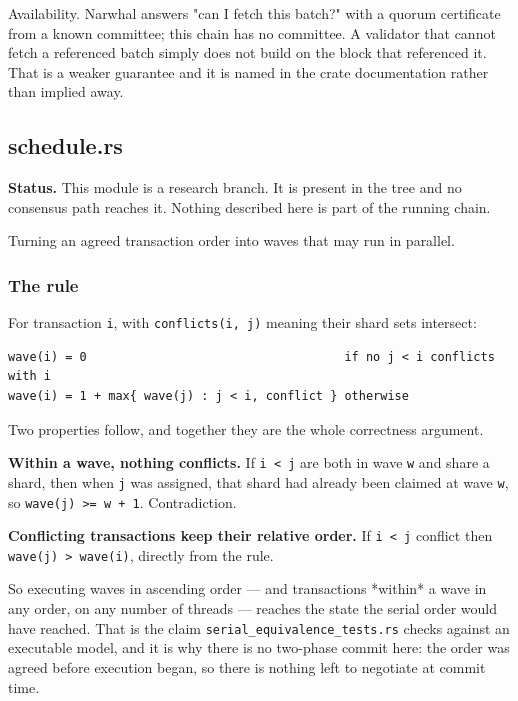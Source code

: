 \documentclass[11pt,a4paper]{article}
\begin{document}
Availability. Narwhal answers "can I fetch this batch?" with a quorum
certificate from a known committee; this chain has no committee. A validator
that cannot fetch a referenced batch simply does not build on the block that
referenced it. That is a weaker guarantee and it is named in the crate
documentation rather than implied away.

\subsection{schedule.rs}
\begin{framed}\noindent\textbf{Status.} This module is a research branch. It is present in the tree and no consensus path reaches it. Nothing described here is part of the running chain.\end{framed}

Turning an agreed transaction order into waves that may run in parallel.

\subsubsection{The rule}

For transaction \texttt{i}, with \texttt{conflicts(i, j)} meaning their shard sets
intersect:

\begin{verbatim}
wave(i) = 0                                    if no j < i conflicts with i
wave(i) = 1 + max{ wave(j) : j < i, conflict } otherwise
\end{verbatim}

Two properties follow, and together they are the whole correctness argument.

\textbf{Within a wave, nothing conflicts.} If \texttt{i < j} are both in wave \texttt{w} and
share a shard, then when \texttt{j} was assigned, that shard had already been
claimed at wave \texttt{w}, so \texttt{wave(j) >= w + 1}. Contradiction.

\textbf{Conflicting transactions keep their relative order.} If \texttt{i < j} conflict
then \texttt{wave(j) > wave(i)}, directly from the rule.

So executing waves in ascending order — and transactions *within* a wave in
any order, on any number of threads — reaches the state the serial order
would have reached. That is the claim \texttt{serial\_equivalence\_tests.rs} checks
against an executable model, and it is why there is no two-phase commit
here: the order was agreed before execution began, so there is nothing left
to negotiate at commit time.
\end{document}
